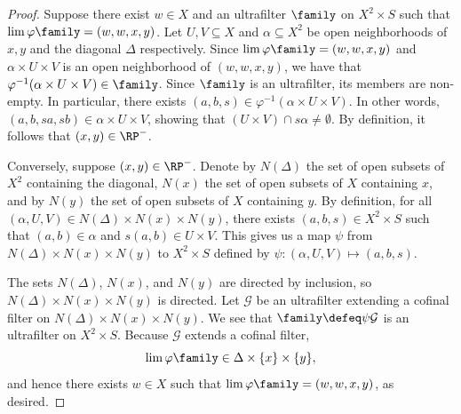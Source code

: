 \begin{proof}
\leanok{}
    Suppose there exist $w \in X$ and an ultrafilter $\family$ on $X^2 \times S$ such that $\lim \varphi \family = (w,w,x,y)$.  Let $U, V \subseteq X$ and $\alpha \subseteq X^2$ be open neighborhoods of $x, y$ and the diagonal $\Delta$ respectively. Since $\lim \varphi \family = (w,w,x,y)$ and $\alpha \times U \times V$ is an open neighborhood of $(w,w,x,y)$, we have that $\varphi^{-1} (\alpha \times U \times V) \in \family$.  Since $\family$ is an ultrafilter, its members are non-empty.  In particular, there exists $(a,b,s) \in \varphi^{-1} (\alpha \times U \times V)$.  In other words, $(a,b,sa,sb) \in \alpha \times U \times V$, showing that $(U \times V) \cap s \alpha \neq \emptyset$.  By definition, it follows that $(x,y) \in \RP^-$.

    Conversely, suppose $(x,y) \in \RP^-$.  Denote by $N(\Delta)$ the set of open subsets of $X^2$ containing the diagonal, $N(x)$ the set of open subsets of $X$ containing $x$, and by $N(y)$ the set of open subsets of $X$ containing $y$.  By definition, for all $(\alpha, U, V) \in N(\Delta) \times N(x) \times N(y)$, there exists $(a, b, s) \in X^2 \times S$ such that $(a,b) \in \alpha$ and $s (a,b) \in U \times V$. This gives us a map $\psi$ from $N(\Delta) \times N(x) \times N(y)$ to $X^2 \times S$ defined by $\psi: (\alpha, U, V) \mapsto (a,b,s)$.

    
    The sets $N(\Delta)$, $N(x)$, and $N(y)$ are directed by inclusion, so $N(\Delta) \times N(x) \times N(y)$ is directed.  Let $\mathcal{G}$ be an ultrafilter extending a cofinal filter on $N(\Delta) \times N(x) \times N(y)$. We see that $\family \defeq \psi \mathcal{G}$ is an ultrafilter on $X^2 \times S$.  Because $\mathcal{G}$ extends a cofinal filter,
    \[
        \lim \varphi \family \in \Delta \times \{x\} \times \{y\},
    \]
    and hence there exists $w \in X$ such that $\lim \varphi \family = (w,w,x,y)$, as desired.
\end{proof}

